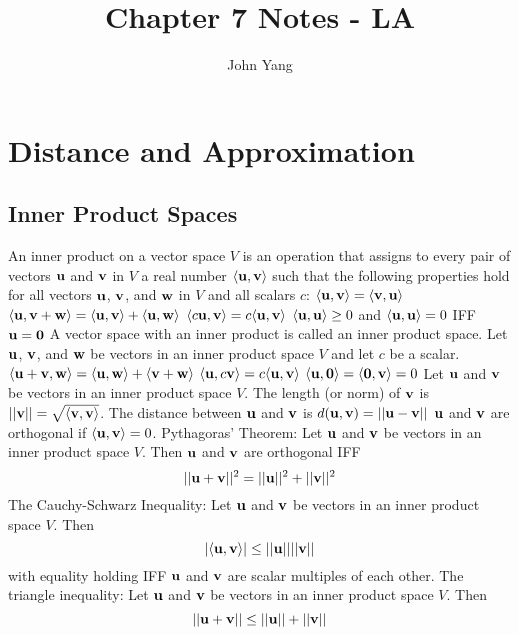 \documentclass{article}
\title{Chapter 7 Notes - LA} %
\author{John Yang}
\begin{document}
    \maketitle
    \tableofcontents
    \section{Distance and Approximation} %
    \subsection{Inner Product Spaces} 
    \begin{outline}
        \1 An inner product on a vector space $V$ is an operation that assigns to every pair of vectors \(\vb u\) and \(\vb v\) in $V$ a real number \(\langle\vb u,\vb v\rangle\) such that the following properties hold for all vectors \(\vb u\), \(\vb v\), and \(\vb w\) in $V$ and all scalars $c$:
            \2 \(\langle\vb u,\vb v\rangle=\langle\vb v,\vb u\rangle\)
            \2 \(\langle\vb u,\vb v+\vb w\rangle=\langle\vb u,\vb v\rangle+\langle\vb u,\vb w\rangle\)
            \2 \(\langle c\vb u,\vb v\rangle=c\langle\vb u,\vb v\rangle\)
            \2 \(\langle\vb u,\vb u\rangle\geq 0\) and \(\langle\vb u,\vb u\rangle=0\) IFF \(\vb u=\vb 0\)
        \1 A vector space with an inner product is called an inner product space. 
        \1 Let \(\vb u\), \(\vb v\), and \(\vb w\) be vectors in an inner product space $V$ and let \(c\) be a scalar. 
            \2 \(\langle\vb u+\vb v,\vb w\rangle=\langle\vb u,\vb w\rangle+\langle\vb v+\vb w\rangle\)
            \2 \(\langle\vb u,c\vb v\rangle=c\langle\vb u,\vb v\rangle\)
            \2 \(\langle\vb u,\vb 0\rangle=\langle\vb 0,\vb v\rangle=0\)
        \1 Let \(\vb u\) and \(\vb v\) be vectors in an inner product space $V$. 
            \2 The length (or norm) of \(\vb v\) is \(||\vb v||=\sqrt{\langle\vb v,\vb v\rangle}\). 
            \2 The distance between \(\vb u\) and \(\vb v\) is \(d(\vb u,\vb v)=||\vb u-\vb v||\)
            \2 \(\vb u\) and \(\vb v\) are orthogonal if \(\langle\vb u,\vb v\rangle=0\). 
        \1 Pythagoras' Theorem: Let \(\vb u\) and \(\vb v\) be vectors in an inner product space $V$. Then \(\vb u\) and \(\vb v\) are orthogonal IFF \[||\vb u+\vb v||^2=||\vb u||^2+||\vb v||^2\]
        \1 The Cauchy-Schwarz Inequality: Let \(\vb u\) and \(\vb v\) be vectors in an inner product space $V$. Then \[|\langle\vb u,\vb v\rangle|\leq||\vb u||||\vb v||\] with equality holding IFF $\vb u$ and $\vb v$ are scalar multiples of each other. 
	\1 The triangle inequality: Let $\vb u$ and $\vb v$ be vectors in an inner product space $V$. Then \[||\vb u+\vb v||\leq||\vb u||+||\vb v||\]
    \end{outline}
\end{document}
